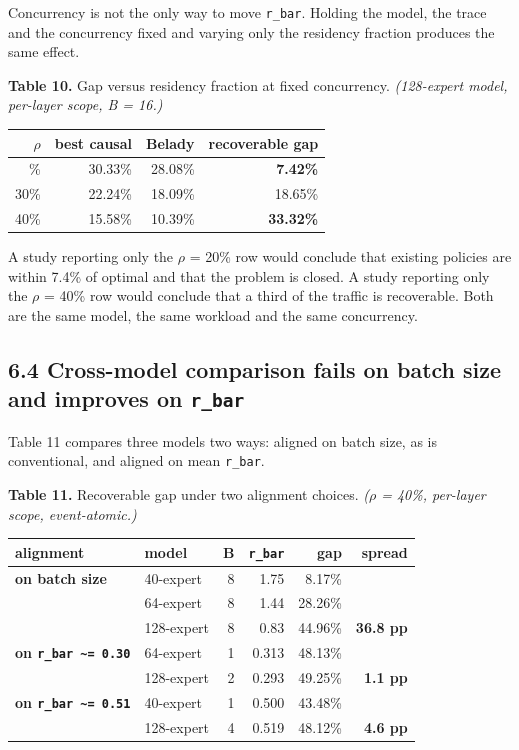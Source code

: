 \documentclass[
  10pt,
  letterpaper,
  10pt]{article}
\newcounter{none} %
\begin{document}
Concurrency is not the only way to move \texttt{r\_bar}. Holding the
model, the trace and the concurrency fixed and varying only the
residency fraction produces the same effect.

\textbf{Table 10.} Gap versus residency fraction at fixed concurrency.
\emph{(128-expert model, per-layer scope, B = 16.)}

{\def\LTcaptype{none} %
\begin{longtable}[]{@{}rrrr@{}}
\toprule\noalign{}
\ensuremath{\rho} & best causal & Belady & recoverable gap \\
\midrule\noalign{}
\endhead
\bottomrule\noalign{}
\endlastfoot
20\% & 30.33\% & 28.08\% & \textbf{7.42\%} \\
30\% & 22.24\% & 18.09\% & 18.65\% \\
40\% & 15.58\% & 10.39\% & \textbf{33.32\%} \\
\end{longtable}
}

A study reporting only the \ensuremath{\rho} = 20\% row would conclude
that existing policies are within 7.4\% of optimal and that the problem
is closed. A study reporting only the \ensuremath{\rho} = 40\% row would
conclude that a third of the traffic is recoverable. Both are the same
model, the same workload and the same concurrency.

\subsection{\texorpdfstring{6.4 Cross-model comparison fails on batch
size and improves on
\texttt{r\_bar}}{6.4 Cross-model comparison fails on batch size and improves on r\_bar}}\label{cross-model-comparison-fails-on-batch-size-and-improves-on-r_bar}

Table 11 compares three models two ways: aligned on batch size, as is
conventional, and aligned on mean \texttt{r\_bar}.

\textbf{Table 11.} Recoverable gap under two alignment choices.
\emph{(\ensuremath{\rho} = 40\%, per-layer scope, event-atomic.)}

{\def\LTcaptype{none} %
\begin{longtable}[]{@{}llrrrr@{}}
\toprule\noalign{}
alignment & model & B & \texttt{r\_bar} & gap & spread \\
\midrule\noalign{}
\endhead
\bottomrule\noalign{}
\endlastfoot
\textbf{on batch size} & 40-expert & 8 & 1.75 & 8.17\% & \\
& 64-expert & 8 & 1.44 & 28.26\% & \\
& 128-expert & 8 & 0.83 & 44.96\% & \textbf{36.8 pp} \\
\textbf{on \texttt{r\_bar\ \textasciitilde{}=\ 0.30}} & 64-expert & 1 &
0.313 & 48.13\% & \\
& 128-expert & 2 & 0.293 & 49.25\% & \textbf{1.1 pp} \\
\textbf{on \texttt{r\_bar\ \textasciitilde{}=\ 0.51}} & 40-expert & 1 &
0.500 & 43.48\% & \\
& 128-expert & 4 & 0.519 & 48.12\% & \textbf{4.6 pp} \\
\end{longtable}
}
\end{document}
